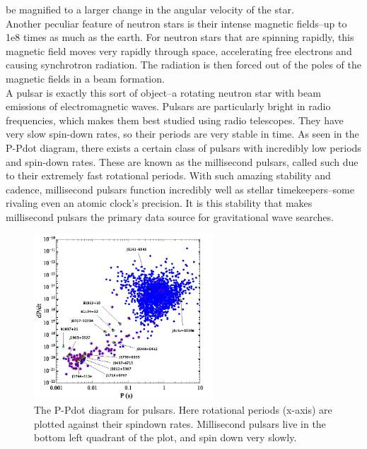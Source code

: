 \documentclass[12pt]{article}
\begin{document}
be magnified to a larger change in the angular velocity of the star.
\\
Another peculiar feature of neutron stars is their intense magnetic fields--up
to 1e8 times as much as the earth. For neutron stars that are spinning rapidly,
this magnetic field moves very rapidly through space, accelerating free
electrons and causing synchrotron radiation. The radiation is then forced out of
the poles of the magnetic fields in a beam formation. 
\\
A pulsar is exactly this sort of object--a rotating neutron star with beam
emissions of electromagnetic waves. Pulsars are particularly bright in radio
frequencies, which makes them best studied using radio telescopes. They have
very slow spin-down rates, so their periods are very stable in time.
As seen in the P-Pdot diagram, there exists a certain class of
pulsars with incredibly low periods and spin-down rates. These are known as the
millisecond pulsars, called such due to their extremely fast rotational periods.
With such amazing stability and cadence, millisecond pulsars function incredibly
well as stellar timekeepers--some rivaling even an atomic clock's precision. It
is this stability that makes millisecond pulsars the primary data source for
gravitational wave searches.

\begin{figure}
\caption{The P-Pdot diagram for pulsars. Here rotational periods (x-axis) are
plotted against their spindown rates. Millisecond pulsars live in the bottom
left quadrant of the plot, and spin down very slowly.}
\includegraphics[width=0.6\textwidth]{./figures/fig_P_Pdot_with_names.png}
\end{figure}
\end{document}
